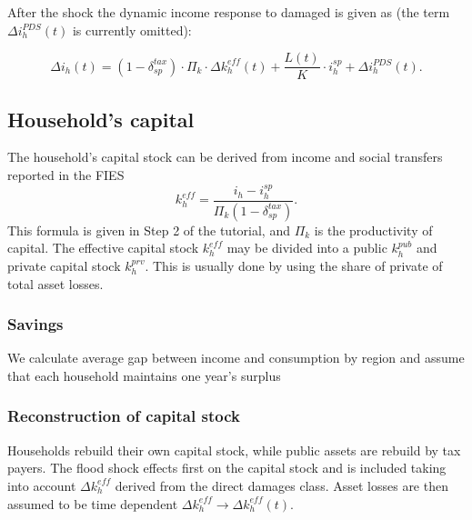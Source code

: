 \documentclass{article}
\begin{document}
After the shock the dynamic income response to damaged is given as  (the term $\Delta i_h^{PDS}(t)$ is currently omitted):

\begin{equation}
\label{eq:ih}
\Delta i_h(t) = (1-\delta_{sp}^{tax}) \cdot  \Pi_k \cdot \Delta k_h^{eff}(t) 
+  \frac{L(t)}{K} \cdot i_h^{sp}+ \Delta i_h^{PDS}(t).
\end{equation}

\subsection{Household's capital}
The household's capital stock can be derived from income and social transfers reported in the FIES
\begin{equation}
  \label{eq:kh}
k_h^{eff} = \frac{i_h-i_h^{sp}}{\Pi_k(1-\delta_{sp}^{tax})}.
\end{equation}
This formula is given in Step 2 of the tutorial, and $\Pi_{k}$ is the productivity of capital.
The effective capital stock $k_{h}^{eff}$ may be divided into a public $k_{h}^{pub}$ and private capital stock $k_{h}^{prv}$. This is usually done by using the share of private of total asset losses.

\subsubsection{Savings}
We calculate average gap between income and consumption by region and assume that each household maintains one year's surplus

\subsubsection{Reconstruction of capital stock}
Households rebuild their own capital stock, while public assets are rebuild by tax payers. The flood shock effects first on the capital stock and is included taking into account $\Delta k_{h}^{eff}$ derived from the direct damages class. Asset losses are then assumed to be time dependent $\Delta k_{h}^{eff} \rightarrow \Delta k_{h}^{eff}(t)$.\\
\end{document}
